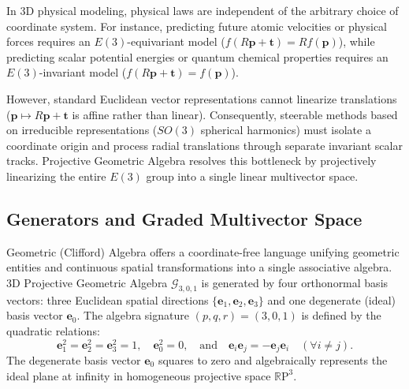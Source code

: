 \documentclass[10pt]{article}
\begin{document}
In 3D physical modeling, physical laws are independent of the arbitrary choice of coordinate system. For instance, predicting future atomic velocities or physical forces requires an $E(3)$-equivariant model ($f(R\mathbf{p} + \mathbf{t}) = R f(\mathbf{p})$), while predicting scalar potential energies or quantum chemical properties requires an $E(3)$-invariant model ($f(R\mathbf{p} + \mathbf{t}) = f(\mathbf{p})$).

However, standard Euclidean vector representations cannot linearize translations ($\mathbf{p} \mapsto R\mathbf{p} + \mathbf{t}$ is affine rather than linear). Consequently, steerable methods based on irreducible representations ($SO(3)$ spherical harmonics) must isolate a coordinate origin and process radial translations through separate invariant scalar tracks. Projective Geometric Algebra resolves this bottleneck by projectively linearizing the entire $E(3)$ group into a single linear multivector space.

\subsection{Generators and Graded Multivector Space}
\label{subsec:pga_generators}

Geometric (Clifford) Algebra offers a coordinate-free language unifying geometric entities and continuous spatial transformations into a single associative algebra. 3D Projective Geometric Algebra $\mathcal{G}_{3,0,1}$ is generated by four orthonormal basis vectors: three Euclidean spatial directions $\{\mathbf{e}_1, \mathbf{e}_2, \mathbf{e}_3\}$ and one degenerate (ideal) basis vector $\mathbf{e}_0$. The algebra signature $(p, q, r) = (3, 0, 1)$ is defined by the quadratic relations:
\begin{equation}
    \mathbf{e}_1^2 = \mathbf{e}_2^2 = \mathbf{e}_3^2 = 1, \quad \mathbf{e}_0^2 = 0, \quad \text{and} \quad \mathbf{e}_i \mathbf{e}_j = -\mathbf{e}_j \mathbf{e}_i \quad (\forall i \neq j).
\end{equation}
The degenerate basis vector $\mathbf{e}_0$ squares to zero and algebraically represents the ideal plane at infinity in homogeneous projective space $\mathbb{R}\mathrm{P}^3$. 
\end{document}
